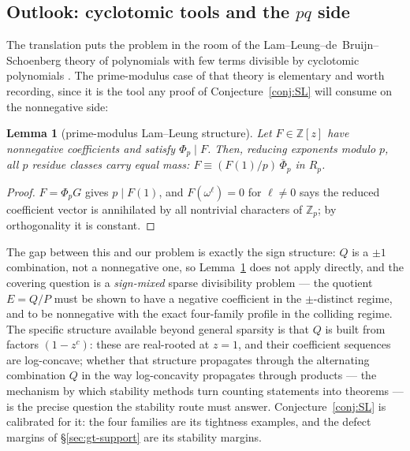 \documentclass[11pt,a4paper]{article}
\numberwithin{equation}{section}
\theoremstyle{plain}
\theoremstyle{plain}
\newtheorem{lemma}[theorem]{Lemma}
\theoremstyle{definition}
\theoremstyle{remark}
\newcommand{\Z}{\mathbb{Z}}
\begin{document}
\subsection{Outlook: cyclotomic tools and the $pq$ side}\label{sec:gt-outlook}

The translation puts the problem in the room of the
Lam--Leung--de~Bruijn--Schoenberg theory of polynomials with few terms
divisible by cyclotomic polynomials
\cite{deBruijnSchoenberg,LamLeung}. The prime-modulus case of that theory is
elementary and worth recording, since it is the tool any proof of
Conjecture~\ref{conj:SL} will consume on the nonnegative side:

\begin{lemma}[prime-modulus Lam--Leung structure]\label{lem:LL}
Let $F\in\Z[z]$ have nonnegative coefficients and satisfy $\Phi_p\mid F$.
Then, reducing exponents modulo $p$, all $p$ residue classes carry equal
mass: $F\equiv(F(1)/p)\,\overline\Phi_p$ in $R_p$.
\end{lemma}

\begin{proof}
$F=\Phi_pG$ gives $p\mid F(1)$, and $F(\omega^\ell)=0$ for $\ell\ne0$ says
the reduced coefficient vector is annihilated by all nontrivial characters
of $\Z_p$; by orthogonality it is constant.
\end{proof}

The gap between this and our problem is exactly the sign structure: $Q$ is
a $\pm1$ combination, not a nonnegative one, so Lemma~\ref{lem:LL} does not
apply directly, and the covering question is a \emph{sign-mixed} sparse
divisibility problem --- the quotient $E=Q/P$ must be shown to have a
negative coefficient in the $\pm$-distinct regime, and to be nonnegative
with the exact four-family profile in the colliding regime. The specific
structure available beyond general sparsity is that $Q$ is built from
factors $(1-z^{c})$: these are real-rooted at $z=1$, and their coefficient
sequences are log-concave; whether that structure propagates through the
alternating combination $Q$ in the way log-concavity propagates through
products --- the mechanism by which stability methods turn counting
statements into theorems \cite{BrandenHuh} --- is the precise question the
stability route must answer. Conjecture~\ref{conj:SL} is calibrated for it:
the four families are its tightness examples, and the defect margins of
\S\ref{sec:gt-support} are its stability margins.
\end{document}
